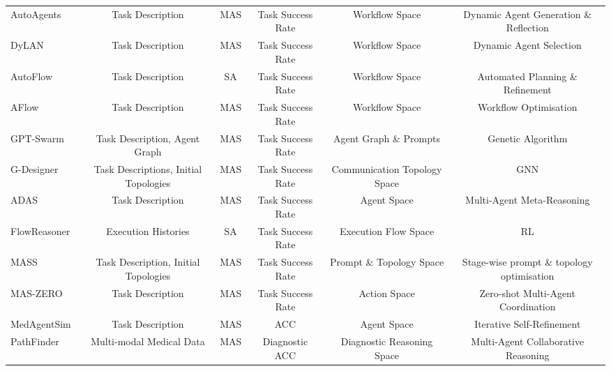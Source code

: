 \begin{table}[t]
{\begin{tabular}{lccccc}
        AutoAgents~\citep{chen2024autoagentsframeworkautomaticagent} & Task Description & MAS & Task Success Rate & Workflow Space & Dynamic Agent Generation \& Reflection \\

        DyLAN~\citep{liu2023dynamic} & Task Description & MAS & Task Success Rate & Workflow Space & Dynamic Agent Selection \\
        AutoFlow~\citep{li2024autoflowautomatedworkflowgeneration} & Task Description & SA & Task Success Rate & Workflow Space & Automated Planning \& Refinement \\

        AFlow~\citep{zhang2025aflow} & Task Description & MAS & Task Success Rate & Workflow Space & Workflow Optimisation \\

        GPT-Swarm~\citep{zhuge2024gptswarm} & Task Description, Agent Graph & MAS & Task Success Rate & Agent Graph \& Prompts & Genetic Algorithm \\

        G-Designer~\citep{zhang2025gdesignerarchitectingmultiagentcommunication} & Task Descriptions, Initial Topologies & MAS & Task Success Rate & Communication Topology Space & GNN \\

        ADAS~\citep{hu2025automated} & Task Description & MAS & Task Success Rate & Agent Space & Multi-Agent Meta-Reasoning \\
        FlowReasoner~\citep{zhang2025evoflowevolvingdiverseagentic} & Execution Histories & SA & Task Success Rate & Execution Flow Space & RL \\

        MASS~\citep{zhou2025multi} & Task Description, Initial Topologies & MAS & Task Success Rate & Prompt \& Topology Space & Stage-wise prompt \& topology optimisation \\

        MAS-ZERO~\citep{ke2025maszerodesigningmultiagentsystems} & Task Description & MAS & Task Success Rate & Action Space & Zero-shot Multi-Agent Coordination \\

        MedAgentSim~\citep{almansoori2025self} & Task Description & MAS & ACC & Agent Space & Iterative Self-Refinement \\

        PathFinder~\citep{ghezloo2025pathfinder} & Multi-modal Medical Data & MAS & Diagnostic ACC & Diagnostic Reasoning Space & Multi-Agent Collaborative Reasoning \\


\end{tabular}}
\end{table}
